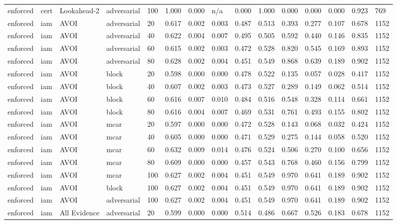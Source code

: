 \begin{table}[!ht]
{\begin{tabular}{lllllllllllllll}
enforced & cert & Lookahead-2 & adversarial & 100 & 1.000 & 0.000 & n/a & 0.000 & 1.000 & 0.000 & 0.000 & 0.000 & 0.923 & 769 \\
enforced & iam & AVOI & adversarial & 20 & 0.617 & 0.002 & 0.003 & 0.487 & 0.513 & 0.393 & 0.277 & 0.107 & 0.678 & 1152 \\
enforced & iam & AVOI & adversarial & 40 & 0.622 & 0.004 & 0.007 & 0.495 & 0.505 & 0.592 & 0.440 & 0.146 & 0.835 & 1152 \\
enforced & iam & AVOI & adversarial & 60 & 0.615 & 0.002 & 0.003 & 0.472 & 0.528 & 0.820 & 0.545 & 0.169 & 0.893 & 1152 \\
enforced & iam & AVOI & adversarial & 80 & 0.628 & 0.002 & 0.004 & 0.451 & 0.549 & 0.868 & 0.639 & 0.189 & 0.902 & 1152 \\
enforced & iam & AVOI & block & 20 & 0.598 & 0.000 & 0.000 & 0.478 & 0.522 & 0.135 & 0.057 & 0.028 & 0.417 & 1152 \\
enforced & iam & AVOI & block & 40 & 0.607 & 0.002 & 0.003 & 0.473 & 0.527 & 0.289 & 0.149 & 0.062 & 0.514 & 1152 \\
enforced & iam & AVOI & block & 60 & 0.616 & 0.007 & 0.010 & 0.484 & 0.516 & 0.548 & 0.328 & 0.114 & 0.661 & 1152 \\
enforced & iam & AVOI & block & 80 & 0.616 & 0.004 & 0.007 & 0.469 & 0.531 & 0.761 & 0.493 & 0.155 & 0.802 & 1152 \\
enforced & iam & AVOI & mcar & 20 & 0.597 & 0.000 & 0.000 & 0.472 & 0.528 & 0.143 & 0.068 & 0.032 & 0.424 & 1152 \\
enforced & iam & AVOI & mcar & 40 & 0.605 & 0.000 & 0.000 & 0.471 & 0.529 & 0.275 & 0.144 & 0.058 & 0.520 & 1152 \\
enforced & iam & AVOI & mcar & 60 & 0.632 & 0.009 & 0.014 & 0.476 & 0.524 & 0.506 & 0.270 & 0.100 & 0.656 & 1152 \\
enforced & iam & AVOI & mcar & 80 & 0.609 & 0.000 & 0.000 & 0.457 & 0.543 & 0.768 & 0.460 & 0.156 & 0.799 & 1152 \\
enforced & iam & AVOI & mcar & 100 & 0.627 & 0.002 & 0.004 & 0.451 & 0.549 & 0.970 & 0.641 & 0.189 & 0.902 & 1152 \\
enforced & iam & AVOI & block & 100 & 0.627 & 0.002 & 0.004 & 0.451 & 0.549 & 0.970 & 0.641 & 0.189 & 0.902 & 1152 \\
enforced & iam & AVOI & adversarial & 100 & 0.627 & 0.002 & 0.004 & 0.451 & 0.549 & 0.970 & 0.641 & 0.189 & 0.902 & 1152 \\
enforced & iam & All Evidence & adversarial & 20 & 0.599 & 0.000 & 0.000 & 0.514 & 0.486 & 0.667 & 0.526 & 0.183 & 0.678 & 1152 \\

\end{tabular}}
\end{table}
